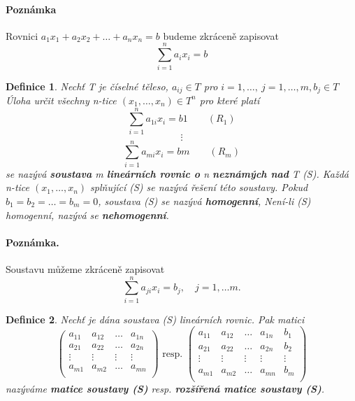 \documentclass[12pt,a4paper]{article}
\newtheorem{definition}{Definice}
\begin{document}
\paragraph{Poznámka} Rovnici $a_1 x_1 + a_2 x_2 + \dots + a_n x_n = b$ budeme zkráceně zapisovat $$\sum^n_{i=1} a_i x_i = b$$


\begin{definition}
	Nechť T je číselné těleso, $a_{ij} \in T$ pro $i = 1, \dots,\ j = 1, \dots, m, b_j \in T$ Úloha určit všechny n-tice  $(x_1, \dots, x_n) \in T^n$ pro které platí
	$$\sum^n_{i=1} a_{1i}x_i = b1 \qquad (R_1)$$
	$$\vdots$$
	$$\sum^n_{i=1} a_{mi}x_i = bm \qquad (R_m)$$
	se nazývá \textbf{soustava} m \textbf{lineárních rovnic o} n \textbf{neznámých nad} T (S). Každá n-tice $(x_1, \dots, x_n)$ splňující (S) se nazývá řešení této soustavy. Pokud $b_1 = b_2 = \dots = b_m = 0$, soustava (S) se nazývá \textbf{homogenní}, Není-li (S) homogenní, nazývá se \textbf{nehomogenní}.
\end{definition}

\paragraph{Poznámka.} Soustavu můžeme zkráceně zapisovat $$\sum_{i=1}^n a_{ji} x_i = b_j, \quad j = 1, \dots m.$$

\begin{definition}
	Nechť je dána soustava (S) lineárních rovnic. Pak matici 
	\begin{displaymath}
		\left( \begin{array}{cccc}
		a_{11} & a_{12} & \dots & a_{1n} \\
		a_{21} & a_{22} & \dots & a_{2n} \\
		\vdots & \vdots & \vdots &\vdots \\
		a_{m1} & a_{m2} & \dots & a_{mn} \\
		\end{array}\right) \text{ resp. }
		\left( \begin{array}{ccccc}
		a_{11} & a_{12} & \dots & a_{1n} & b_1 \\
		a_{21} & a_{22} & \dots & a_{2n}  & b_2\\
		\vdots & \vdots & \vdots &\vdots  & \vdots\\
		a_{m1} & a_{m2} & \dots & a_{mn} & b_m\\
		\end{array}\right)		
	\end{displaymath}
	nazýváme \textbf{matice soustavy (S)} resp. \textbf{rozšířená matice soustavy (S)}. 
\end{definition}
\end{document}
